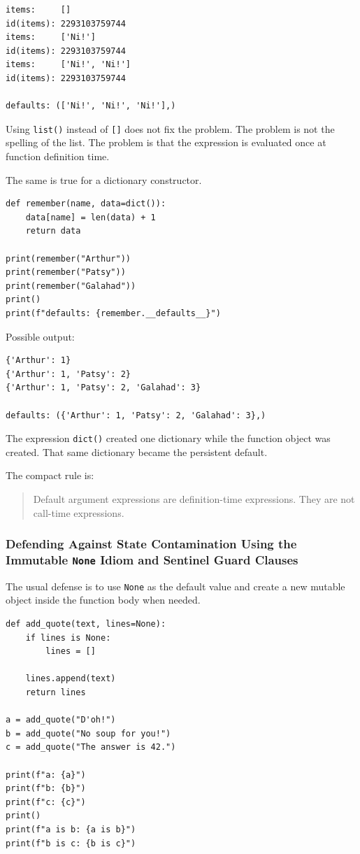 \begin{verbatim}
items:     []
id(items): 2293103759744
items:     ['Ni!']
id(items): 2293103759744
items:     ['Ni!', 'Ni!']
id(items): 2293103759744

defaults: (['Ni!', 'Ni!', 'Ni!'],)
\end{verbatim}

Using \texttt{list()} instead of \texttt{[]} does not fix the problem. The problem is not the spelling of the list. The problem is that the expression is evaluated once at function definition time.

The same is true for a dictionary constructor.

\begin{verbatim}
def remember(name, data=dict()):
    data[name] = len(data) + 1
    return data

print(remember("Arthur"))
print(remember("Patsy"))
print(remember("Galahad"))
print()
print(f"defaults: {remember.__defaults__}")
\end{verbatim}

Possible output:

\begin{verbatim}
{'Arthur': 1}
{'Arthur': 1, 'Patsy': 2}
{'Arthur': 1, 'Patsy': 2, 'Galahad': 3}

defaults: ({'Arthur': 1, 'Patsy': 2, 'Galahad': 3},)
\end{verbatim}

The expression \texttt{dict()} created one dictionary while the function object was created. That same dictionary became the persistent default.

The compact rule is:

\begin{quote}
Default argument expressions are definition-time expressions. They are not call-time expressions.
\end{quote}

\subsubsection{Defending Against State Contamination Using the Immutable \texttt{None} Idiom and Sentinel Guard Clauses}

The usual defense is to use \texttt{None} as the default value and create a new mutable object inside the function body when needed.

\begin{verbatim}
def add_quote(text, lines=None):
    if lines is None:
        lines = []

    lines.append(text)
    return lines

a = add_quote("D'oh!")
b = add_quote("No soup for you!")
c = add_quote("The answer is 42.")

print(f"a: {a}")
print(f"b: {b}")
print(f"c: {c}")
print()
print(f"a is b: {a is b}")
print(f"b is c: {b is c}")
\end{verbatim}

